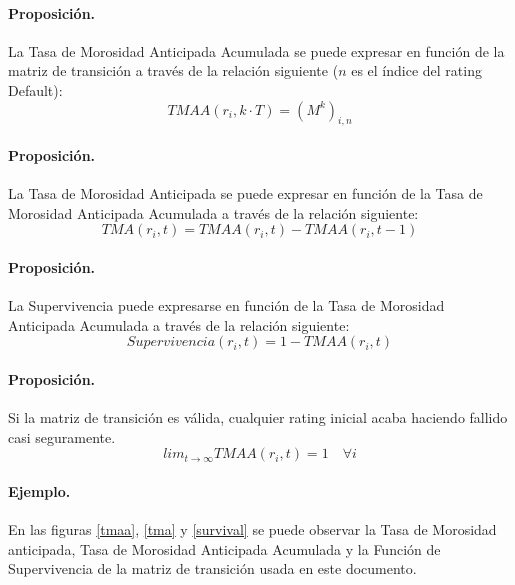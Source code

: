 \paragraph{Proposici\'on.} La Tasa de Morosidad Anticipada Acumulada se 
puede expresar en funci\'on de la matriz de transici\'on a trav\'es de la
relaci\'on siguiente ($n$ es el \'indice del rating Default):
\begin{displaymath}
TMAA(r_i,k \cdot T) = (M^k)_{i,n}
\end{displaymath}

\paragraph{Proposici\'on.} La Tasa de Morosidad Anticipada se puede expresar 
en funci\'on de la Tasa de Morosidad Anticipada Acumulada a trav\'es de la
relaci\'on siguiente:
\begin{displaymath}
TMA(r_i, t) =  TMAA(r_i, t) - TMAA(r_i, t-1)
\end{displaymath}

\paragraph{Proposici\'on.} La Supervivencia puede expresarse en funci\'on de
la Tasa de Morosidad Anticipada Acumulada a trav\'es de la relaci\'on siguiente:
\begin{displaymath}
Supervivencia(r_i, t) =  1 - TMAA(r_i, t)
\end{displaymath}

\paragraph{Proposici\'on.} Si la matriz de transici\'on es v\'alida, cualquier 
rating inicial acaba haciendo fallido casi seguramente.
\begin{displaymath}
lim_{t \to \infty} TMAA(r_i, t) =  1 \quad \forall i
\end{displaymath}

\paragraph{Ejemplo.} En las figuras \ref{tmaa}, \ref{tma} y \ref{survival} 
se puede observar la Tasa de Morosidad anticipada, Tasa de Morosidad Anticipada 
Acumulada y la Funci\'on de Supervivencia de la matriz de transici\'on usada en 
este documento.


